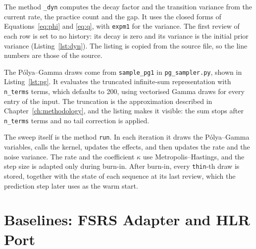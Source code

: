 The method \texttt{\_dyn} computes the decay factor and the transition variance from the current rate,
the practice count and the gap. It uses the closed forms of Equations~\eqref{eq:phi} and \eqref{eq:q},
with \texttt{expm1} for the variance. The first review of each row is set to no history: its decay is
zero and its variance is the initial prior variance (Listing~\ref{lst:dyn}). The listing is copied
from the source file, so the line numbers are those of the source.



The P\'olya--Gamma draws come from \texttt{sample\_pg1} in \texttt{pg\_sampler.py}, shown in
Listing~\ref{lst:pg}. It evaluates the truncated infinite-sum representation with \texttt{n\_terms}
terms, which defaults to 200, using vectorised Gamma draws for every entry of the input. The truncation
is the approximation described in Chapter~\ref{ch:methodology}, and the listing makes it visible: the
sum stops after \texttt{n\_terms} terms and no tail correction is applied.



The sweep itself is the method \texttt{run}. In each iteration it draws the P\'olya--Gamma variables,
calls the kernel, updates the effects, and then updates the rate and the noise variance. The rate and
the coefficient $\kappa$ use Metropolis--Hastings, and the step size is adapted only during burn-in.
After burn-in, every \texttt{thin}-th draw is stored, together with the state of each sequence at its
last review, which the prediction step later uses as the warm start.

\section{Baselines: FSRS Adapter and HLR Port}
\label{sec:impl-baselines}


